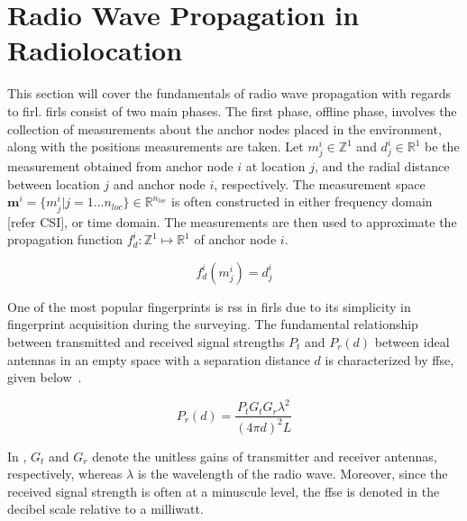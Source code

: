 \section{Radio Wave Propagation in Radiolocation}
\label{sec:fundamentals}
    This section will cover the fundamentals of radio wave propagation with regards to \gls{firl}.
    \Gls{firl}s consist of two main phases.
    The first phase, offline phase,  involves the collection of measurements about the anchor nodes placed in the environment, along with the positions measurements are taken.
    Let $m^i_j \in \mathbb{Z}^1$ and $d^i_j \in \mathbb{R}^1$ be the measurement obtained from anchor node $i$ at  location $j$, and the radial distance between location $j$ and anchor node $i$, respectively.
    The measurement space $\bm{m}^i=\{m^i_j | j=1 \ldots n_{loc}\} \in \mathbb{R}^{n_{loc}}$ is often constructed in either frequency domain [refer CSI], or time domain.
    The measurements are then used to approximate the propagation function $f^i_d:\mathbb{Z}^1\mapsto\mathbb{R}^1$ of anchor node $i$.

    \begin{equation}
        f^i_d(m^i_j)=d^i_j
    \end{equation}

    One of the most popular fingerprints is \gls{rss} in \gls{firl}s due to its simplicity in fingerprint acquisition during the surveying.
    The fundamental relationship between transmitted and received signal strengths $P_t$ and $P_r(d)$ between ideal antennas in an empty space with a separation distance $d$ is characterized by \gls{ffse}, given below~\cite{friis1946note}.

    \begin{equation}
        \label{eq:friisWatts}
            P_r(d) = \dfrac{P_t  G_t  G_r \lambda^2}{{\left(4 \pi d\right)}^2 L}
    \end{equation}

    In , $G_t$ and $G_r$ denote the unitless gains of transmitter and receiver antennas, respectively, whereas $\lambda$ is the wavelength of the radio wave.
    Moreover, since the received signal strength is often at a minuscule level, the \gls{ffse} is denoted in the decibel scale relative to a milliwatt.

